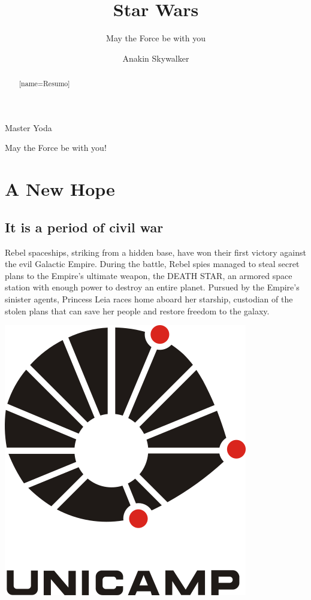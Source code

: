 \documentclass[oneside]{ifgw}
\author{Anakin Skywalker}
\institute[Instituto Darth Plagueis]{Darth Plagueis Institute}
\title[Guerra nas estrelas]{Star Wars}
\subtitle[Que a Força esteja com você]{May the Force be with you}
\begin{document}
\maketitle
\makebackcover
\dedication{To my son, Luke Skywalker.}
\epigraph{Master Yoda}{May the Force be with you!}

\begin{abstract}[name=Resumo]
\lipsum[1]
\end{abstract}

\begin{abstract}
\lipsum[1]
\end{abstract}

\tableofcontents


\chapter{A New Hope}
\section{It is a period of civil war}

Rebel spaceships, striking from a hidden base, have won their first victory against the evil Galactic Empire.  During the battle, Rebel spies managed to steal secret plans to the Empire's ultimate weapon, the DEATH STAR, an armored space station with enough power to destroy an entire planet. Pursued by the Empire's sinister agents, Princess Leia races home aboard her starship, custodian of the stolen plans that can save her people and restore freedom to the galaxy.

\lipsum[1-3]


\begin{center}
\includegraphics[width=.35\textwidth]{Images/unicamp.png}
\end{center}
\end{document}
